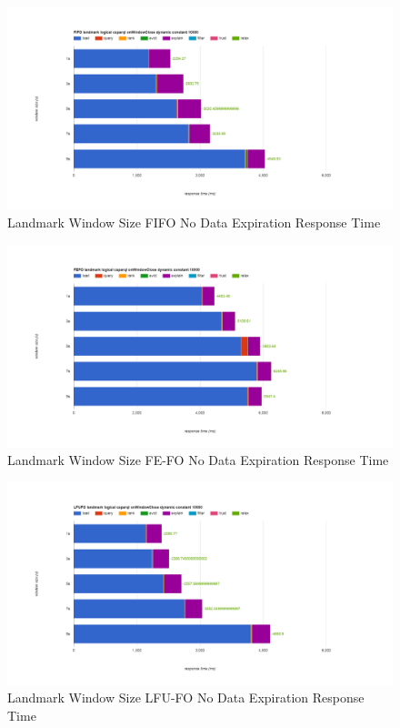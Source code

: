 \begin{figure}[!htbp]
    \centering
    \includegraphics[width=\textwidth]{img/app3-land-ws-fifo-no-r.png}
    \caption{Landmark Window Size FIFO No Data Expiration Response Time}
\end{figure}
\begin{figure}[!htbp]
    \centering
    \includegraphics[width=\textwidth]{img/app3-land-ws-fefo-no-r.png}
    \caption{Landmark Window Size FE-FO No Data Expiration Response Time}
\end{figure}
\begin{figure}[!htbp]
    \centering
    \includegraphics[width=\textwidth]{img/app3-land-ws-lfufo-no-r.png}
    \caption{Landmark Window Size LFU-FO No Data Expiration Response Time}
\end{figure}
